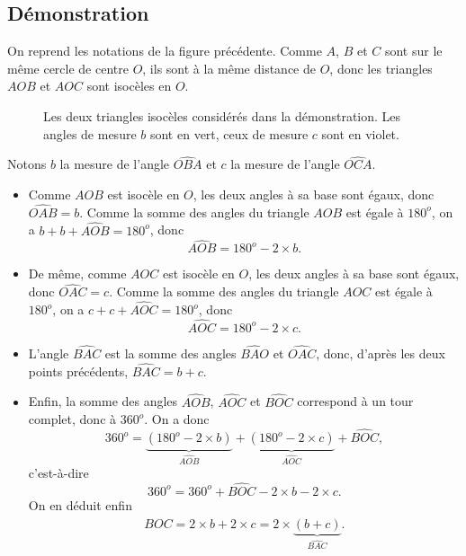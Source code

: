 \documentclass[12 pt]{article}
\theoremstyle{plain}
\newcounter{n}
\numberwithin{n}{section}
\begin{document}
\subsection{Démonstration}

On reprend les notations de la figure précédente. Comme $A$, $B$ et $C$ sont sur le même cercle de centre $O$, 
ils sont à la même distance de $O$, donc les triangles $AOB$ et $AOC$ sont isocèles en $O$. 


\begin{figure}[H]
\center
{}
\caption{Les deux triangles isocèles considérés dans la démonstration. Les angles de mesure $b$ sont en vert, ceux de mesure $c$ sont en violet.}
\end{figure}

Notons $b$ la mesure de l'angle $\widehat{OBA}$ et $c$ la mesure de l'angle $\widehat{OCA}$. \begin{itemize}
\item Comme $AOB$ est isocèle en $O$, les deux angles à sa base sont égaux, donc $\widehat{OAB}=b$. 
Comme la somme des angles du triangle $AOB$ est égale à $180^o$, on a $b + b + \widehat{AOB} =180^o $, donc 
\[\widehat{AOB} =180^o - 2\times b.\]
\item De même, comme $AOC$ est isocèle en $O$, les deux angles à sa base sont égaux, donc $\widehat{OAC}=c$.
Comme la somme des angles du triangle $AOC$ est égale  à $180^o$, on a $c + c + \widehat{AOC} =180^o $, donc 
\[\widehat{AOC} =180^o - 2\times c.\]
\item L'angle $\widehat{BAC}$ est la somme des angles $\widehat{BAO}$ et $\widehat{OAC}$, donc, d'après les deux points précédents, $\widehat{BAC}= b+c$.
\item Enfin, la somme des angles $\widehat{AOB}$, $\widehat{AOC}$ et $\widehat{BOC}$ correspond à un tour complet, donc à $360^o$. On a donc \[360^o = \underbrace{(180^o - 2\times b)}_{\widehat{AOB}} + 
\underbrace{(180^o - 2\times c)}_{\widehat{AOC}} + \widehat{BOC},\] 
c'est-à-dire \[ 360^o = 360^o + \widehat{BOC} - 2 \times b - 2 \times c.\]
On en déduit enfin \[\widehat{BOC} = 2 \times b + 2 \times c = 2\times \underbrace{(b + c)}_{\widehat{BAC}}.\]
\end{itemize}
\end{document}
